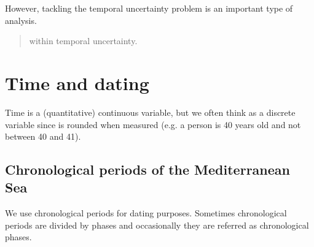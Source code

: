 \documentclass[a4paper,12pt,english]{sphinxhowto}
\begin{document}

However, tackling the temporal uncertainty problem is an important type of analysis.

\begin{quote}




{\hyperref[\detokenize{Uncertainty:missing}]{}} within temporal uncertainty.


\end{quote}



\section{Time and dating}
\label{\detokenize{Time:time-and-dating}}\label{\detokenize{Time:time}}\label{\detokenize{Time::doc}}
Time is a (quantitative) continuous variable, but we often think  as a discrete variable
since is rounded when measured (e.g. a person is 40 years old and not between 40 and 41).



\subsection{Chronological periods of the Mediterranean Sea}
\label{\detokenize{Time:chronological-periods-of-the-mediterranean-sea}}
We use chronological periods for dating purposes.
Sometimes chronological periods are divided by phases and occasionally they are referred as chronological phases.

\end{document}
